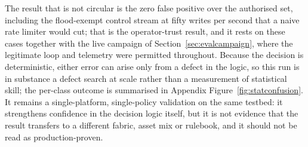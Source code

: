The result that is not circular is the zero false positive over the authorised set, including the flood-exempt control stream at fifty writes per second that a naive rate limiter would cut; that is the operator-trust result, and it rests on these cases together with the live campaign of Section~\ref{sec:evalcampaign}, where the legitimate loop and telemetry were permitted throughout. Because the decision is deterministic, either error can arise only from a defect in the logic, so this run is in substance a defect search at scale rather than a measurement of statistical skill; the per-class outcome is summarised in Appendix Figure~\ref{fig:statconfusion}. It remains a single-platform, single-policy validation on the same testbed: it strengthens confidence in the decision logic itself, but it is not evidence that the result transfers to a different fabric, asset mix or rulebook, and it should not be read as production-proven.

